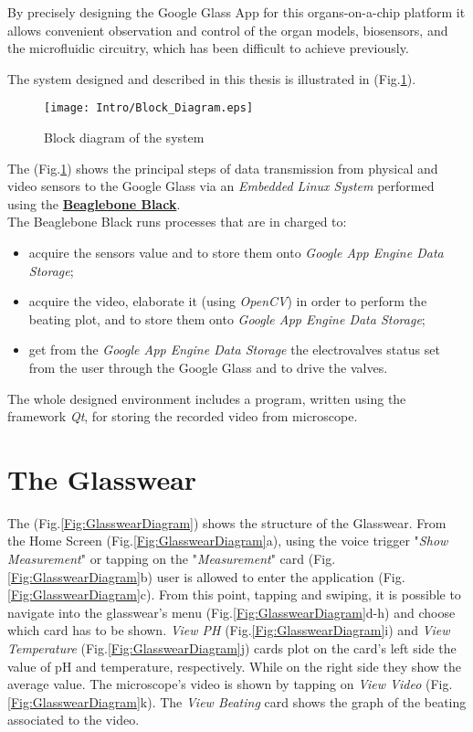 By precisely designing the Google Glass App for this organs-on-a-chip platform it allows convenient observation and control of the organ models, biosensors, and the microfluidic circuitry, which has been difficult to achieve previously.

The system designed and described in this thesis is illustrated in (Fig.\ref{Fig:BlockDiagram}).
 
 \begin{figure}[h]
 	\centering
 	\texttt{[image: Intro/Block\_Diagram.eps]}
 	\caption{Block diagram of the system}
 	\label{Fig:BlockDiagram}
 	
 \end{figure}
 
 The (Fig.\ref{Fig:BlockDiagram}) shows the principal steps of data transmission from physical and video sensors to the Google Glass via an \textit{Embedded Linux System} performed using the \href{http://beagleboard.org/BLACK}{\textbf{Beaglebone Black}}.\\
 The Beaglebone Black runs processes that are in charged to:
 \begin{itemize}
 	\item acquire the sensors value and to store them onto \textit{Google App Engine Data Storage};
 	\item acquire the video, elaborate it (using \textit{OpenCV}) in order to perform the beating plot, and to store them onto \textit{Google App Engine Data Storage};
 	\item get from the \textit{Google App Engine Data Storage} the electrovalves status set from the user through the Google Glass and to drive the valves.
 \end{itemize} 
 
 The whole designed environment includes a program, written using the framework \textit{Qt}, for storing the recorded video from microscope.
 
 \section*{The Glasswear}
 The (Fig.\ref{Fig:GlasswearDiagram}) shows the structure of the Glasswear. From the Home Screen (Fig.\ref{Fig:GlasswearDiagram}a), using the voice trigger "\textit{Show Measurement}" or tapping on the "\textit{Measurement}" card (Fig.\ref{Fig:GlasswearDiagram}b) user is allowed to enter the application (Fig.\ref{Fig:GlasswearDiagram}c). From this point, tapping and swiping, it is possible to navigate into the glasswear's menu (Fig.\ref{Fig:GlasswearDiagram}d-h) and choose which card has to be shown. \textit{View PH} (Fig.\ref{Fig:GlasswearDiagram}i) and \textit{View Temperature} (Fig.\ref{Fig:GlasswearDiagram}j) cards  plot on the card's left side the value of pH and temperature, respectively. While on the right side they show the average value. The microscope's video is shown by tapping on \textit{View Video} (Fig.\ref{Fig:GlasswearDiagram}k). The \textit{View Beating} card shows the graph of the beating associated to the video.
 \\
 
